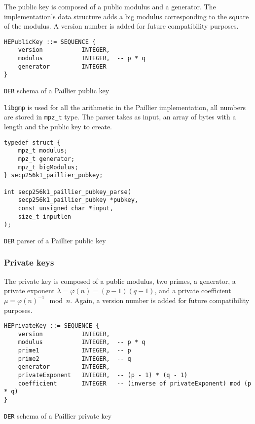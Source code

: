 The public key is composed of a public modulus and a generator. The
implementation's data structure adds a big modulus corresponding to the square of
the modulus. A version number is added for future compatibility purposes.

\begin{listing}
  \begin{verbatim}
HEPublicKey ::= SEQUENCE {
    version           INTEGER,
    modulus           INTEGER,  -- p * q
    generator         INTEGER
}
  \end{verbatim}
	\caption{\texttt{DER} schema of a Paillier public key}
	\label{lst:DERSchemaPaillierPub}
\end{listing}

\texttt{libgmp} is used for all the arithmetic in the Paillier implementation, all
numbers are stored in \texttt{mpz\_t} type. The parser takes as input, an array
of bytes with a length and the public key to create.

\begin{listing}
  \begin{verbatim}
typedef struct {
    mpz_t modulus;
    mpz_t generator;
    mpz_t bigModulus;
} secp256k1_paillier_pubkey;

int secp256k1_paillier_pubkey_parse(
    secp256k1_paillier_pubkey *pubkey,
    const unsigned char *input,
    size_t inputlen
);
  \end{verbatim}
	\caption{\texttt{DER} parser of a Paillier public key}
	\label{lst:DERImplPaillierParsePub}
\end{listing}


\subsubsection{Private keys}

The private key is composed of a public modulus, two primes, a generator, a
private exponent $\lambda = \varphi(n) = (p-1)(q-1)$, and a private coefficient
$\mu = \varphi(n)^{-1} \mod n$. Again, a version number is added for future
compatibility purposes.

\begin{listing}
  \begin{verbatim}
HEPrivateKey ::= SEQUENCE {
    version           INTEGER,
    modulus           INTEGER,  -- p * q
    prime1            INTEGER,  -- p
    prime2            INTEGER,  -- q
    generator         INTEGER,
    privateExponent   INTEGER,  -- (p - 1) * (q - 1)
    coefficient       INTEGER   -- (inverse of privateExponent) mod (p * q)
}
  \end{verbatim}
	\caption{\texttt{DER} schema of a Paillier private key}
	\label{lst:DERSchemaPaillierPriv}
\end{listing}

